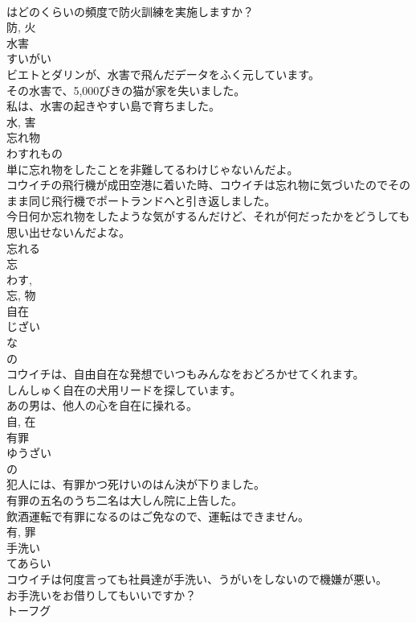 \documentclass[8pt]{extreport}
\begin{document}
\begin{CJK}{UTF8}{min}
\\	はどのくらいの頻度で防火訓練を実施しますか？	
\\	防, 火	
\\	水害	
\\	すいがい	
\\	ビエトとダリンが、水害で飛んだデータをふく元しています。	
\\	その水害で、5,000びきの猫が家を失いました。	
\\	私は、水害の起きやすい島で育ちました。	
\\	水, 害	
\\	忘れ物	
\\	わすれもの	
\\	単に忘れ物をしたことを非難してるわけじゃないんだよ。	
\\	コウイチの飛行機が成田空港に着いた時、コウイチは忘れ物に気づいたのでそのまま同じ飛行機でポートランドへと引き返しました。	
\\	今日何か忘れ物をしたような気がするんだけど、それが何だったかをどうしても思い出せないんだよな。	
\\	忘れる 
\\	忘 
\\	わす, 
\\	忘, 物	
\\	自在	
\\	じざい	
\\	な 
\\	の 
\\	コウイチは、自由自在な発想でいつもみんなをおどろかせてくれます。	
\\	しんしゅく自在の犬用リードを探しています。	
\\	あの男は、他人の心を自在に操れる。	
\\	自, 在	
\\	有罪	
\\	ゆうざい	
\\	の 
\\	犯人には、有罪かつ死けいのはん決が下りました。	
\\	有罪の五名のうち二名は大しん院に上告した。	
\\	飲酒運転で有罪になるのはご免なので、運転はできません。	
\\	有, 罪	
\\	手洗い	
\\	てあらい	
\\	コウイチは何度言っても社員達が手洗い、うがいをしないので機嫌が悪い。	
\\	お手洗いをお借りしてもいいですか？	
\\	トーフグ

\end{CJK}
\end{document}
